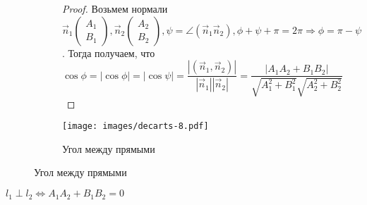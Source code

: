 \begin{enumerate}
\begin{figure}[h]
\begin{subfigure}[t!]{0.6\linewidth}
\begin{proof}
				Возьмем нормали \(\vec n_1\begin{pmatrix}
					A_1 \\ B_1
				\end{pmatrix}, \vec n_2\begin{pmatrix}
					A_2 \\ B_2
				\end{pmatrix},
				\psi = \angle(\vec n_1  \vec n_2), \phi + \psi + \pi = 2\pi \Longrightarrow \phi = \pi - \psi\). 
				Тогда получаем, что \(\cos\phi = |\cos\phi| = |\cos\psi| = \dfrac{|(\vec n_1, \vec n_2)|}{|\vec n_1||\vec n_2|} =
				\dfrac{|A_1A_2+B_1B_2|}{\sqrt{A_1^2+B_1^2}\sqrt{A_2^2+B_2^2}}\)
			\end{proof}
		\end{subfigure}
		\begin{subfigure}[b!]{0.4\linewidth}
			\centering
			\texttt{[image: images/decarts-8.pdf]}
			\caption*{Угол между прямыми}
			\label{Decart8}
		\end{subfigure}
	\end{figure}
	\begin{corollary}
		\(l_1 \perp l_2\Longleftrightarrow A_1A_2+B_1B_2 = 0\)
	\end{corollary}
\end{enumerate}

